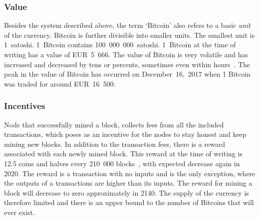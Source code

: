 \subsubsection{Value}
Besides the system described above, the term `Bitcoin' also refers to a basic \textit{unit} of the currency. Bitcoin is further divisible into smaller units. The smallest unit is 1~satoshi. 1~Bitcoin contains 100~000~000~satoshi. 1~Bitcoin at the time of writing has a value of EUR~5~666. The value of Bitcoin is very volatile and has increased and decreased by tens or percents, sometimes even within hours~\cite{Adkisson2018WhyVolatile}. The peak in the value of Bitcoin has occurred on December~16,~2017 when 1 Bitcoin was traded for around EUR~16~500.

\subsubsection{Incentives}
Node that successfully mined a block, collects fees from all the included transactions, which poses as an incentive for the nodes to stay honest and keep mining new blocks. In addition to the transaction fees, there is a reward associated with each newly mined block. This reward at the time of writing is 12.5 coins and halves every 210~000 blocks~\cite{Judmayer2017BlocksMechanisms}, with expected decrease again in 2020. The reward is a transaction with no inputs and is the only exception, where the outputs of a transactions are higher than its inputs. The reward for mining a block will decrease to zero approximately in 2140. The supply of the currency is therefore limited and there is an upper bound to the number of Bitcoins that will ever exist\footnotemark.


